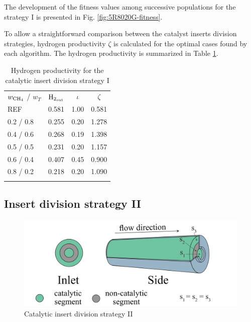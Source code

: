 \documentclass[preprint,12pt]{elsarticle}
\begin{document}
The development of the fitness values among successive populations for the strategy I is presented in Fig. \ref{fig:5R8020G-fitness}. 


To allow a straightforward comparison between the catalyst inserts division strategies, hydrogen productivity $\zeta$ is calculated for the optimal cases found by each algorithm. The hydrogen productivity is summarized in Table \ref{tab:5RH2prod}. 

\begin{center}
\begin{table}
\centering
\caption{Hydrogen productivity for the catalytic insert division strategy I}
\label{tab:5RH2prod}
\begin{tabular}{l|c|c|c}
\hline\noalign{\smallskip}
 $w_{\rm{CH_4}}$ / $ w_T $ & $\rm{H_{2_{out}}}$ & $\iota$ & $\zeta$ \\
\noalign{\smallskip}\hline\noalign{\smallskip}
REF         & 0.581     & 1.00  &  0.581\\
0.2 / 0.8   & 0.255     & 0.20  & 1.278 \\
0.4 / 0.6   & 0.268     & 0.19  & 1.398 \\
0.5 / 0.5   & 0.231     & 0.20  & 1.157 \\
0.6 / 0.4   & 0.407     & 0.45  & 0.900 \\
0.8 / 0.2   & 0.218     & 0.20  & 1.090 \\
\noalign{\smallskip}\hline
\end{tabular}
\end{table}
\end{center}


\clearpage


\subsection{Insert division strategy II}
\label{subsec:5RE}

\begin{figure}[h!]
\centering
\includegraphics[width=120mm]{5segEqSurf.png}
\caption{\label{fig:5segEqSurf}Catalytic insert division strategy II}
\end{figure}
\end{document}

